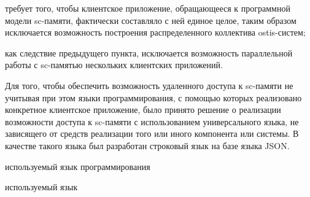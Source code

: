 \begin{SCn}
\begin{scnsubstruct}
\begin{scnsubstruct}
{\begin{scnitemize}
                    \item требует того, чтобы клиентское приложение, обращающееся к программной модели sc-памяти, фактически составляло с ней единое целое, таким образом исключается возможность построения распределенного коллектива ostis-систем;
                    \item как следствие предыдущего пункта, исключается возможность параллельной работы с sc-памятью нескольких клиентских приложений.
                \end{scnitemize}
                Для того, чтобы обеспечить возможность удаленного доступа к sc-памяти не учитывая при этом языки программирования, с помощью которых реализовано конкретное клиентское приложение, было принято решение о реализации возможности доступа к sc-памяти с использованием универсального языка, не зависящего от средств реализации того или иного компонента или системы. В качестве такого языка был разработан строковый язык на базе языка JSON.}
            \begin{scnsubstruct}
                \begin{scnrelfromlist}{используемый язык программирования}
                \end{scnrelfromlist}
                \begin{scnrelfromlist}{используемый язык}
                \end{scnrelfromlist}
                \begin{scnindent}

\end{scnindent}
\end{scnsubstruct}
\end{scnsubstruct}
\end{scnsubstruct}
\end{SCn}
